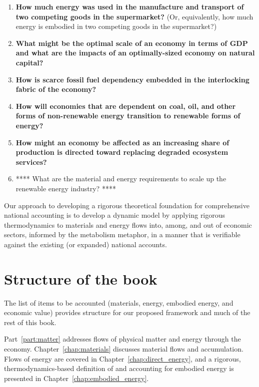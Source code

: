 \begin{enumerate}
	\item{\textbf{How much energy was used in the manufacture and transport
				of two competing goods in the supermarket?} 
				(Or, equivalently, how much energy is embodied 
				in two competing goods in the supermarket?)}
	\item{\textbf{What might be the optimal scale of an economy in terms of GDP 
				and what are the impacts of an optimally-sized economy on natural capital?}}
    \item{\textbf{How is scarce fossil fuel dependency embedded 
    			in the interlocking fabric of the economy?}} 
    \item{\textbf{How will economies that are dependent on coal, oil, 
     			and other forms of non-renewable energy transition 
    			to renewable forms of energy?}}
	\item{\textbf{How might an economy be affected as an increasing share of production
				is directed toward replacing 
				degraded ecosystem services?}~\cite[p.~221]{kummel2011}​}
	\item{**** What are the material and energy requirements to scale up 
				the renewable energy industry? ****}
\end{enumerate}

Our approach to developing a rigorous theoretical foundation for 
comprehensive national accounting is to
develop a dynamic model 
by applying rigorous thermodynamics 
to materials and energy flows into, among, 
and out of economic sectors,
informed by the metabolism metaphor,
in a manner that is verifiable against 
the existing (or expanded) 
national accounts.


\section{Structure of the book}
\label{sec:structure}

The list of items to be accounted 
(materials, energy, embodied energy, and economic value)
provides structure for our proposed framework
and much of the rest of this book.

Part~\ref{part:matter} addresses flows of physical matter and energy
through the economy.
Chapter~\ref{chap:materials} discusses material flows and accumulation.
Flows of energy are covered in Chapter~\ref{chap:direct_energy}, 
and a rigorous, thermodynamics-based definition of and accounting for 
embodied energy is presented in Chapter~\ref{chap:embodied_energy}.

